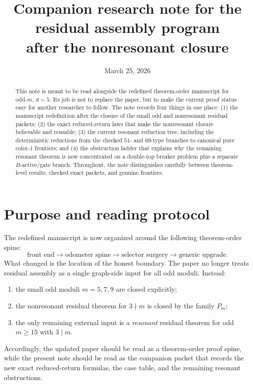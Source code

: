 \documentclass[11pt]{article}
\title{Companion research note for the residual assembly program\\
after the nonresonant closure}
\author{}
\date{March 25, 2026}
\newcommand{\Pm}{P_m}
\begin{document}
\maketitle

\begin{abstract}
This note is meant to be read alongside the redefined theorem-order manuscript
for odd-$m$, $d=5$.
Its job is not to replace the paper, but to make the current proof status easy
for another researcher to follow.
The note records four things in one place:
(1) the manuscript redefinition after the closure of the small odd and
nonresonant residual packets;
(2) the exact reduced-return laws that make the nonresonant closure believable
and reusable;
(3) the current resonant reduction tree, including the deterministic reductions
from the checked $51$- and $69$-type branches to canonical pure color-$1$
frontiers; and
(4) the obstruction ladder that explains why the remaining resonant theorem is
now concentrated on a double-top breaker problem plus a separate
$B$-active/gate branch.
Throughout, the note distinguishes carefully between theorem-level results,
checked exact packets, and genuine frontiers.
\end{abstract}

\tableofcontents

\section{Purpose and reading protocol}

The redefined manuscript is now organized around the following theorem-order
spine:
\[
\text{front end}
\to
\text{odometer spine}
\to
\text{selector surgery}
\to
\text{generic upgrade}.
\]
What changed is the location of the honest boundary.
The paper no longer treats residual assembly as a single graph-side input for
all odd moduli.
Instead:
\begin{enumerate}[label=\textup{(\arabic*)},leftmargin=2.8em]
\item the small odd moduli $m=5,7,9$ are closed explicitly;
\item the nonresonant residual theorem for $3\nmid m$ is closed by the family
      \(\Pm\);
\item the only remaining external input is a \emph{resonant} residual theorem
      for odd $m\ge 15$ with $3\mid m$.
\end{enumerate}
Accordingly, the updated paper should be read as a theorem-order proof spine,
while the present note should be read as the companion packet that records the
new exact reduced-return formulas, the case table, and the remaining resonant
obstructions.
\end{document}
